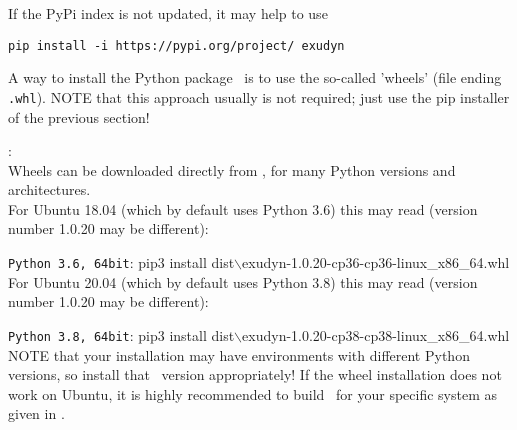If the PyPi index is not updated, it may help to use 
\bi 
  \item[] \texttt{pip install -i https://pypi.org/project/ exudyn}
\ei

A way to install the Python package \codeName\ is to use the so-called 'wheels' (file ending \texttt{.whl}).
NOTE that this approach usually is not required; just use the pip installer of the previous section!

\noindent {}:\vspace{6pt}\\
Wheels can be downloaded directly from , for many Python versions and architectures.
\vspace{6pt}\\
For Ubuntu 18.04 (which by default uses Python 3.6) this may read (version number 1.0.20 may be different):
\bi
  \item \texttt{Python 3.6, 64bit}: pip3 install dist$\backslash$exudyn-1.0.20-cp36-cp36-linux\_x86\_64.whl
\ei
For Ubuntu 20.04 (which by default uses Python 3.8) this may read (version number 1.0.20 may be different):
\bi
  \item \texttt{Python 3.8, 64bit}: pip3 install dist$\backslash$exudyn-1.0.20-cp38-cp38-linux\_x86\_64.whl
\ei
NOTE that your installation may have environments with different Python versions, so install that \codeName\ version appropriately!
If the wheel installation does not work on Ubuntu, it is highly recommended to build \codeName\ for your specific system as given in .

